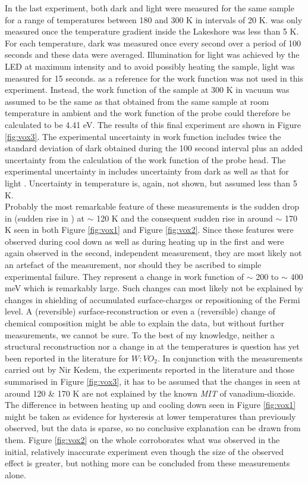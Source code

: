 In the last experiment, both dark and light \cpd{} were measured for the same sample for a range of temperatures between 180 and 300 K in intervals of 20 K. \cpd{} was only measured once the temperature gradient inside the Lakeshore was less than 5 K. For each temperature, dark \cpd{} was measured once every second over a period of 100 seconds and these data were averaged. Illumination for light \cpd{} was achieved by the LED at maximum intensity and to avoid possibly heating the sample, light \cpd{} was measured for 15 seconds. \hopg{} as a reference for the work function was not used in this experiment. Instead, the work function of the sample at 300 K in vacuum was assumed to be the same as that obtained from the same sample at room temperature in ambient and the work function of the probe could therefore be calculated to be 4.41 eV. The results of this final experiment are shown in Figure \ref{fig:vox3}. The experimental uncertainty in work function includes twice the standard deviation of dark \cpd{} obtained during the 100 second interval plus an added uncertainty from the calculation of the work function of the probe head. The experimental uncertainty in \spv{} includes uncertainty from dark \cpd{} as well as that for light \cpd{}. Uncertainty in temperature is, again, not shown, but assumed less than 5 K.\\
Probably the most remarkable feature of these measurements is the sudden drop in \cpd{} (sudden rise in \wf{}) at $\sim$ 120 K and the consequent sudden rise in \cpd{} around $\sim$ 170 K seen in both Figure \ref{fig:vox1} and Figure \ref{fig:vox2}. Since these features were observed during cool down as well as during heating up in the first and were again observed in the second, independent measurement, they are most likely not an artefact of the measurement, nor should they be ascribed to simple experimental failure. They represent a change in work function of $\sim$ 200 to $\sim$ 400 meV which is remarkably large. Such changes can most likely not be explained by changes in shielding of accumulated surface-charges or repositioning of the Fermi level. A (reversible) surface-reconstruction or even a (reversible) change of chemical composition might be able to explain the data, but without further measurements, we cannot be sure. To the best of my knowledge, neither a structural reconstruction nor a change in \wf{} at the temperatures is question has yet been reported in the literature for $W:VO_2$. In conjunction with the measurements carried out by Nir Kedem, the experiments reported in the literature and those summarised in Figure \ref{fig:vox3}, it has to be assumed that the changes in \wf{} seen at around 120 \& 170 K are not explained by the known \emph{MIT} of vanadium-dioxide. The difference in \cpd{} between heating up and cooling down seen in Figure \ref{fig:vox1} might be taken as evidence for hysteresis at lower temperatures than previously observed, but the data is sparse, so no conclusive explanation can be drawn from them. Figure \ref{fig:vox2} on the whole corroborates what was observed in the initial, relatively inaccurate experiment even though the size of the observed effect is greater, but nothing more can be concluded from these measurements alone.\\
